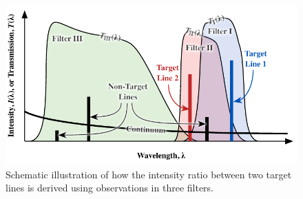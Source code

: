 \documentclass[preprint]{aastex}
\begin{document}
\begin{figure}[t]
  \centering
  \includegraphics[width=0.8\linewidth]{filter-schematic}
  \caption{Schematic illustration of how the intensity ratio between two target lines is derived using observations in three filters. }
  \label{fig:bandpass}
\end{figure}
\end{document}
